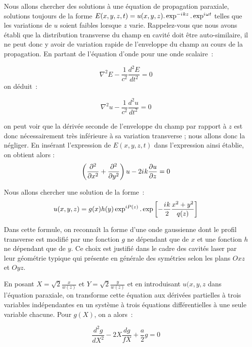 \documentclass[a4paper]{book}
\newcommand{\iu}{{i\mkern1mu}}
\begin{document}
Nous allons chercher des solutions à une équation de propagation paraxiale, solutions toujours de la forme $E(x,y,z,t)=u(x,y,z).\exp^{-\iu kz}.\exp^{\iu \omega t}$ telles que les variations de $u$ soient faibles lorsque $z$ varie. Rappelez-vous que nous avons établi que la distribution transverse du champ en cavité doit être auto-similaire, il ne peut donc y avoir de variation rapide de l'enveloppe du champ au cours de la propagation. En partant de l'équation d'onde pour une onde scalaire~:

\begin{equation}
    \nabla^2E -\frac{1}{c^2}\frac{d^2E}{dt^2}=0
\end{equation}
on déduit~: 

\begin{equation}
    \nabla^2u -\frac{1}{c^2}\frac{d^2u}{dt^2}=0
\end{equation}

on peut voir que la dérivée seconde de l'enveloppe du champ par rapport à $z$ est donc nécessairement très inférieure à sa variation transverse ; nous allons donc la négliger. En insérant l'expression de $E(x,y,z,t)$ dans l'expression ainsi établie, on obtient alors : 
\begin{equation}
    \left(\frac{\partial^2}{\partial x^2}+\frac{\partial^2 }{\partial y^2}\right)u-2\iu k \frac{\partial u}{\partial z}=0
\end{equation}

Nous allons chercher une solution de la forme~:
\begin{equation}
    u(x,y,z)=g(x)h(y)\exp^{iP(z)}.\exp\left[-\frac{\iu k }{2}\frac{x^2+y^2}{q(z)}\right]
\end{equation}

Dans cette formule, on reconnaît la forme d'une onde gaussienne dont le profil transverse est modifié par une fonction $g$ ne dépendant que de $x$ et une fonction $h$ ne dépendant que de $y$. Ce choix est justifié dans le cadre des cavités laser par leur géométrie typique qui présente en générale des symétries selon les plans $Oxz$ et $Oyz$.

En posant $X=\sqrt{2}\frac{x}{w(z)}$ et $Y=\sqrt{2}\frac{y}{w(z)}$ et en introduisant $u(x,y,z$ dans l'équation paraxiale, on transforme cette équation aux dérivées partielles à trois variables indépendantes en un système à trois équations différentielles à une seule variable chacune. Pour $g(X)$, on a alors~:

\begin{equation}
    \frac{d^2g}{dX^2}-2X\frac{dg}{fX}+\frac{a}{2}g=0
\end{equation}
\end{document}
